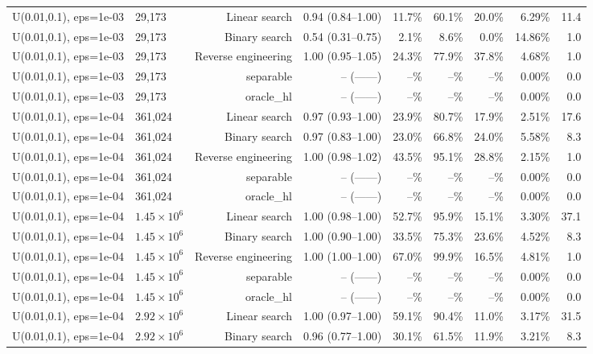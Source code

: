 \begin{tabular}{llrrrrrrr}
U(0.01,0.1), eps=1e-03 & 29,173 & Linear search & 0.94 (0.84--1.00) & 11.7\% & 60.1\% & 20.0\% & 6.29\% & 11.4 \\
U(0.01,0.1), eps=1e-03 & 29,173 & Binary search & 0.54 (0.31--0.75) & 2.1\% & 8.6\% & 0.0\% & 14.86\% & 1.0 \\
U(0.01,0.1), eps=1e-03 & 29,173 & Reverse engineering & 1.00 (0.95--1.05) & 24.3\% & 77.9\% & 37.8\% & 4.68\% & 1.0 \\
U(0.01,0.1), eps=1e-03 & 29,173 & separable & -- (------) & --\% & --\% & --\% & 0.00\% & 0.0 \\
U(0.01,0.1), eps=1e-03 & 29,173 & oracle_hl & -- (------) & --\% & --\% & --\% & 0.00\% & 0.0 \\
U(0.01,0.1), eps=1e-04 & 361,024 & Linear search & 0.97 (0.93--1.00) & 23.9\% & 80.7\% & 17.9\% & 2.51\% & 17.6 \\
U(0.01,0.1), eps=1e-04 & 361,024 & Binary search & 0.97 (0.83--1.00) & 23.0\% & 66.8\% & 24.0\% & 5.58\% & 8.3 \\
U(0.01,0.1), eps=1e-04 & 361,024 & Reverse engineering & 1.00 (0.98--1.02) & 43.5\% & 95.1\% & 28.8\% & 2.15\% & 1.0 \\
U(0.01,0.1), eps=1e-04 & 361,024 & separable & -- (------) & --\% & --\% & --\% & 0.00\% & 0.0 \\
U(0.01,0.1), eps=1e-04 & 361,024 & oracle_hl & -- (------) & --\% & --\% & --\% & 0.00\% & 0.0 \\
U(0.01,0.1), eps=1e-04 & $1.45\times 10^{6}$ & Linear search & 1.00 (0.98--1.00) & 52.7\% & 95.9\% & 15.1\% & 3.30\% & 37.1 \\
U(0.01,0.1), eps=1e-04 & $1.45\times 10^{6}$ & Binary search & 1.00 (0.90--1.00) & 33.5\% & 75.3\% & 23.6\% & 4.52\% & 8.3 \\
U(0.01,0.1), eps=1e-04 & $1.45\times 10^{6}$ & Reverse engineering & 1.00 (1.00--1.00) & 67.0\% & 99.9\% & 16.5\% & 4.81\% & 1.0 \\
U(0.01,0.1), eps=1e-04 & $1.45\times 10^{6}$ & separable & -- (------) & --\% & --\% & --\% & 0.00\% & 0.0 \\
U(0.01,0.1), eps=1e-04 & $1.45\times 10^{6}$ & oracle_hl & -- (------) & --\% & --\% & --\% & 0.00\% & 0.0 \\
U(0.01,0.1), eps=1e-04 & $2.92\times 10^{6}$ & Linear search & 1.00 (0.97--1.00) & 59.1\% & 90.4\% & 11.0\% & 3.17\% & 31.5 \\
U(0.01,0.1), eps=1e-04 & $2.92\times 10^{6}$ & Binary search & 0.96 (0.77--1.00) & 30.1\% & 61.5\% & 11.9\% & 3.21\% & 8.3 \\

\end{tabular}

